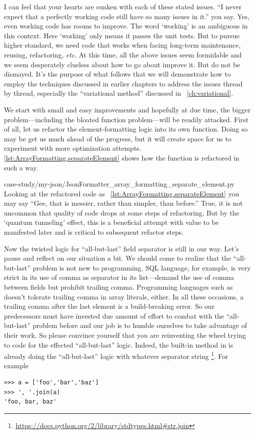 I can feel that your hearts are sunken with each of these stated issues.
``I never expect that a perfectly working code still have so many issues in it.'' you say.
Yes, even working code has rooms to improve.
The word `working' is an ambiguous in this context.
Here `working' only means it passes the unit tests.
But to pursue higher standard, we need code that works when facing long-term maintenance,
reusing, refactoring, \textit{etc}.
At this time, all the above issues seem formidable and we seem desperately clueless about how to
go about improve it.
But do not be dismayed.
It's the purpose of what follows that we will demonstrate how to employ the techniques discussed in
earlier chapters to address the issues thread by thread, especially the ``variational method''
discussed in ~\autoref{ch:variational}.

We start with small and easy improvements and
hopefully at due time, the bigger problem---including the bloated function problem---will be readily
attacked.
First of all, let us refactor the element-formatting logic into its own function.
Doing so may be get us much ahead of the progress,
but it will create space for us to experiment with more optimization attempts.
\@\autoref{lst:ArrayFormatting.separateElement} shows how the function  is
refactored in such a way.

{case-study/my-json/JsonFormatter_array_formatting_separate_element.py}
Looking at the refactored code as ~\autoref{lst:ArrayFormatting.separateElement} you may say
``Gee, that is messier, rather than simpler, than before.''
True, it is not uncommon that quality of code drops at some steps of refactoring.
But by the `quantum tunneling' effect, this is a beneficial attempt with
value to be manifested later and is critical to subsequent refactor steps.

Now the twisted logic for ``all-but-last'' field separator is still in our way.
Let's pause and reflect on our situation a bit.
We should come to realize that the ``all-but-last'' problem is not new to programming.
SQL language, for example, is very strict in its use of comma as separator in its 
list---demand the use of comma between fields but prohibit trailing comma.
Programming languages such as \cpp doesn't tolerate trailing comma in array literals, either.
In all these occasions, a trailing comma after the last element is a build-breaking error.
So our predecessors must have invested due amount of effort to combat with the ``all-but-last''
problem before and our job is to humble ourselves to take advantage of their work.
So please convince yourself that you are reinventing the wheel trying to code for the effected
``all-but-last'' logic.
Indeed, the built-in method  in \python is already doing the ``all-but-last'' logic
with whatever separator string
\footnote{\url{https://docs.python.org/2/library/stdtypes.html\#str.join}}.
For example
\begin{lstlisting}
>>> a = ['foo','bar','baz']
>>> ', '.join(a)
'foo, bar, baz'
\end{lstlisting}

